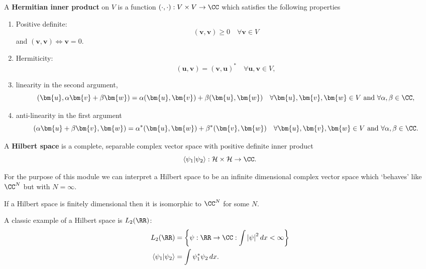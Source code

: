 \documentclass[12pt, a4paper]{article}
\begin{document}
\begin{definition}
    A \textbf{Hermitian inner product} on \(V\) is a function \((\cdot, \cdot) : V \times V \to \CC\) which satisfies the following properties
    \begin{enumerate}
        \item Positive definite:
        \[(\bm{v},\bm{v}) \geq 0 \quad \forall \bm{v} \in V\]
        and \((\bm{v},\bm{v}) \iff \bm{v}=0\).
        \item Hermiticity:
        \[(\bm{u},\bm{v}) = (\bm{v},\bm{u})^* \quad \forall \bm{u},\bm{v} \in V,\]
        \item linearity in the second argument,
        \[(\bm{u},\alpha \bm{v} + \beta \bm{w}) = \alpha (\bm{u},\bm{v}) +\beta (\bm{u},\bm{w}) \quad \forall \bm{u},\bm{v},\bm{w} \in V \text{ and } \forall \alpha,\beta \in \CC,\]
        \item anti-linearity in the first argument 
        \[(\alpha \bm{u} +\beta \bm{v}, \bm{w}) = \alpha^* (\bm{u},\bm{w})+ \beta^*(\bm{v},\bm{w}) \quad \forall \bm{u},\bm{v},\bm{w} \in V \text{ and } \forall \alpha,\beta \in \CC.\]
    \end{enumerate}
\end{definition}

\begin{definition}
    A \textbf{Hilbert space} is a complete, separable complex vector space with positive definite inner product 
    \[\bra{\psi_1} \ket{\psi_2} : \mathcal{H} \times \mathcal{H} \to \CC.\]
\end{definition}

\begin{mdnote}
    For the purpose of this module we can interpret a Hilbert space to be an infinite dimensional complex vector space which `behaves' like \(\CC^N\) but with \(N=\infty\).
\end{mdnote}

\begin{mdremark}
    If a Hilbert space is finitely dimensional then it is isomorphic to \(\CC^N\) for some \(N\).
\end{mdremark}

\begin{example}
    A classic example of a Hilbert space is \(L_2(\RR)\): 
    \[\begin{aligned}
        L_2(\RR) &= \left\{\psi : \RR \to \CC : \int \abs{\psi}^2 \, dx <\infty\right\} \\
        \bra{\psi_1}\ket{\psi_2} &= \int \psi_1^*\psi_2 \, dx.
    \end{aligned}\]
\end{example}
\end{document}
